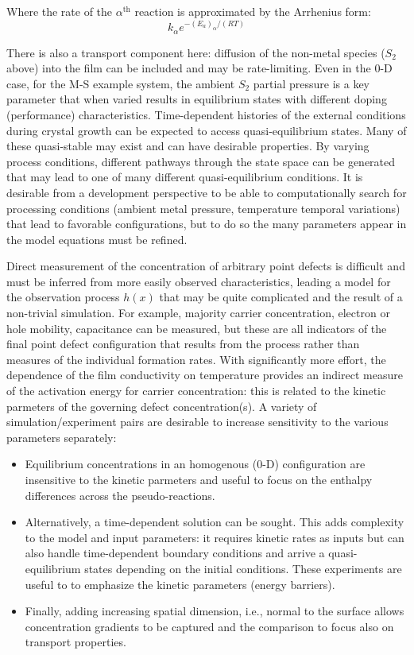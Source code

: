 \documentclass[11pt]{article}
\begin{document}
Where the rate of the $\alpha^{\mathrm{th}}$ reaction is approximated
by the Arrhenius form:
\begin{equation}
  \label{eq:1}
  k_\alpha e^{-(E_a)_\alpha/(RT)}
\end{equation}

There is also a transport component here: diffusion of the non-metal
species ($S_2$ above) into the film can be included and may be
rate-limiting. Even in the 0-D case, for the M-S example system, the
ambient $S_2$ partial pressure is a key parameter that when varied
results in equilibrium states with different doping (performance)
characteristics.  Time-dependent histories of the external conditions
during crystal growth can be expected to access quasi-equilibrium
states. Many of these quasi-stable may exist and can have desirable
properties. By varying process conditions, different pathways through
the state space can be generated that may lead to one of many
different quasi-equilibrium conditions. It is desirable from a
development perspective to be able to computationally search for
processing conditions (ambient metal pressure, temperature temporal
variations) that lead to favorable configurations, but to do so the
many parameters appear in the model equations must be refined. 

Direct measurement of the concentration of arbitrary point defects is
difficult and must be inferred from more easily observed
characteristics, leading a model for the observation process $h(x)$
that may be quite complicated and the result of a non-trivial
simulation.  For example, majority carrier concentration, electron or
hole mobility, capacitance can be measured, but these are all
indicators of the final point defect configuration that results from
the process rather than measures of the individual formation
rates. With significantly more effort, the dependence of the film
conductivity on temperature provides an indirect measure of the
activation energy for carrier concentration: this is related to the
kinetic parmeters of the governing defect concentration(s).  A variety
of simulation/experiment pairs are desirable to increase sensitivity
to the various parameters separately:

\begin{itemize}
\item Equilibrium concentrations in an homogenous (0-D) configuration
  are insensitive to the kinetic parmeters and useful to focus
  on the enthalpy differences across the pseudo-reactions. 
\item Alternatively, a time-dependent solution can be sought. This
  adds complexity to the model and input parameters: it requires
  kinetic rates as inputs but can also handle time-dependent boundary
  conditions and arrive a quasi-equilibrium states depending on the
  initial conditions. These experiments are useful to to emphasize the
kinetic parameters (energy barriers). 
\item Finally, adding increasing spatial dimension, i.e., normal to
  the surface allows concentration gradients to be captured and the
  comparison to focus also on transport properties. 
\end{itemize}
\end{document}
